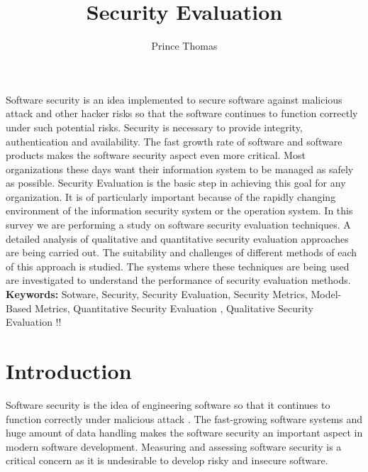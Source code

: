 \documentclass[pdftex,english,oribibl]{llncs}
\title{Security Evaluation}
\author{Prince Thomas}
\institute{University of Stuttgart\\Institute of Software Technology (ISTE)\\70569 Stuttgart, Germany}
\makeatletter
\gdef\@keywords{}
\renewenvironment{abstract}{%
  \list{}{\advance\topsep by0.35cm\relax\small%
          \leftmargin=1cm%
          \labelwidth=\z@%
          \listparindent=\z@%
          \itemindent\listparindent%
          \rightmargin\leftmargin}%
          \item[\hskip\labelsep\bfseries\abstractname]}{%
  \if!\@keywords!\else{\item[~]\item[\hskip\labelsep\bfseries\keywordname]\@keywords}\fi%
  \endlist}
\makeatother
\begin{document}
\maketitle

\begin{abstract}
Software security is an idea implemented to secure software against malicious attack and other hacker risks so that the software continues to function correctly under such potential risks. Security is necessary to provide integrity, authentication and availability. The fast growth rate of software and software products makes the software security aspect even more critical. Most organizations these days want their information system to be managed as safely as possible. Security Evaluation is the basic step in achieving this goal for any organization. It is of particularly important because of the rapidly changing environment of the information security system or the operation system. In this survey we are performing a study on software security evaluation techniques. A detailed analysis of qualitative and quantitative security evaluation approaches are being carried out. The suitability and challenges of different methods of each of this approach is studied. The systems where these techniques are being used are investigated to understand the performance of security evaluation methods.\\

\textbf{Keywords:} Sotware, Security, Security Evaluation, Security Metrics, Model-Based Metrics, Quantitative Security Evaluation , Qualitative Security Evaluation
\end{abstract}


\section{Introduction}

  Software security is the idea of engineering software so that it continues to function correctly under malicious attack \cite{1281254_McGraw}. The fast-growing software systems and huge amount of data handling makes the software security an important aspect in modern software development. Measuring and assessing software security is a critical concern as it is undesirable to develop risky and insecure software. 
  
\end{document}

